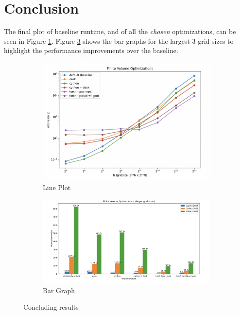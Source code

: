 \documentclass[a4paper,10pt]{article}
\begin{document}
\section{Conclusion}
The final plot of baseline runtime, and of all the \emph{chosen} optimizations, can be seen in Figure \ref{fig:final_plot}.
Figure \ref{fig:final_bar} shows the bar graphs for the largest 3 grid-sizes to highlight the performance improvements over the baseline.
\begin{figure}[h]
     \centering
     \begin{subfigure}[b]{0.45\textwidth}
        \centering
        \includegraphics[width=\linewidth]{images/final/final_plot.png}
        \caption{Line Plot}
        \label{fig:final_plot}
     \end{subfigure}
     \hfill
     \begin{subfigure}[b]{0.45\textwidth}
        \centering
        \includegraphics[width=\linewidth]{images/final/final_bar.png}
        \caption{Bar Graph}
        \label{fig:final_bar}
     \end{subfigure}
  \caption{Concluding results}
\end{figure}
\end{document}
